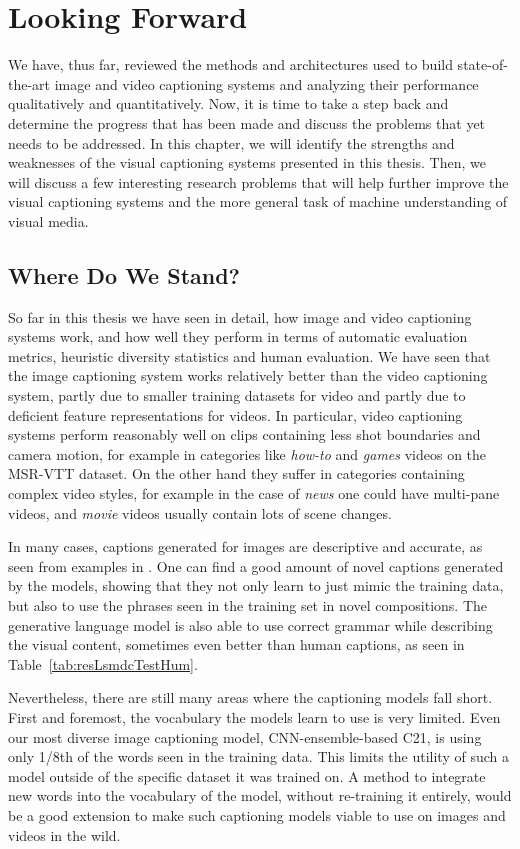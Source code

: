 \chapter{Looking Forward}
\label{chapter:discussion}
We have, thus far, reviewed the methods and architectures used to build
state-of-the-art image and video captioning systems and analyzing their
performance qualitatively and quantitatively.
Now, it is time to take a step back and determine the progress that has been
made and discuss the problems that yet needs to be addressed.
In this chapter, we will identify the strengths and weaknesses of the visual
captioning systems presented in this thesis.
Then, we will discuss a few interesting research problems that will help further
improve the visual captioning systems and the more general task of machine
understanding of visual media.  \section{Where Do We Stand?}

So far in this thesis we have seen in detail, how image and video captioning
systems work, and how well they perform in terms of automatic evaluation
metrics, heuristic diversity statistics and human evaluation.
We have seen that the image captioning system works relatively better than the
video captioning system, partly due to smaller training datasets for video and
partly due to deficient feature representations for videos.
In particular, video captioning systems perform reasonably well on clips
containing less shot boundaries and camera motion, for example in categories
like \emph{how-to} and \emph{games} videos on the MSR-VTT dataset.
On the other hand they suffer in categories containing complex video styles, for
example in the case of \emph{news} one could have multi-pane videos, and
\emph{movie} videos usually contain lots of scene changes.

In many cases, captions generated for images are descriptive and accurate, as
seen from examples in .
One can find a good amount of novel captions generated by the models, showing
that they not only learn to just mimic the training data, but also to use the
phrases seen in the training set in novel compositions.
The generative language model is also able to use correct grammar while
describing the visual content, sometimes even better than human captions, as
seen in Table~\ref{tab:resLsmdcTestHum}.

Nevertheless, there are still many areas where the captioning models fall short.
First and foremost, the vocabulary the models learn to use is very limited.
Even our most diverse image captioning model, CNN-ensemble-based C21,
is using only 1/8th of the words seen in the training data. 
This limits the utility of such a model outside of the specific dataset it was
trained on.
A method to integrate new words into the vocabulary of the model, without
re-training it entirely, would be a good extension to make such captioning
models viable to use on images and videos in the wild.

